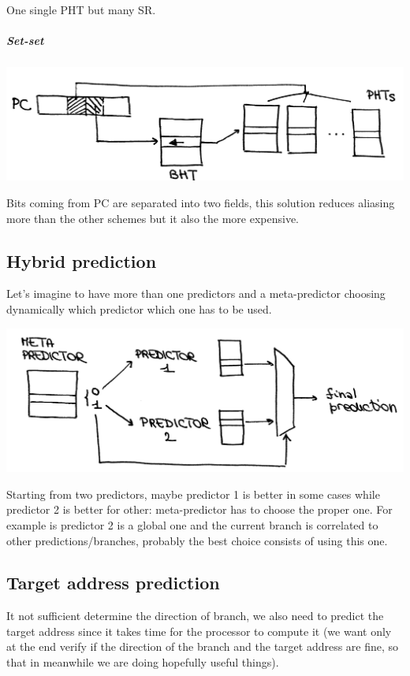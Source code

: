One single PHT but many SR.

\subparagraph{Set-set}

\begin{center}
  \includegraphics[width=0.7\linewidth]{img/img3/23}
\end{center}

Bits coming from PC are separated into two fields, this solution reduces aliasing more than the other schemes but it also the more expensive.

\subsection{Hybrid prediction}
Let's imagine to have more than one predictors and a meta-predictor choosing dynamically which predictor which one has to be used.
\begin{center}
  \includegraphics[width=0.7\linewidth]{img/img3/24}
\end{center}

Starting from two predictors, maybe predictor 1 is better in some cases while predictor 2 is better for other: meta-predictor has to choose the proper one. For example is predictor 2 is a global one and the current branch is correlated to other predictions/branches, probably the best choice consists of using this one.

\subsection{Target address prediction}
It not sufficient determine the direction of branch, we also need to predict the target address since it takes time for the processor to compute it (we want only at the end verify if the direction of the branch and the target address are fine, so that in meanwhile we are doing hopefully useful things). \\

